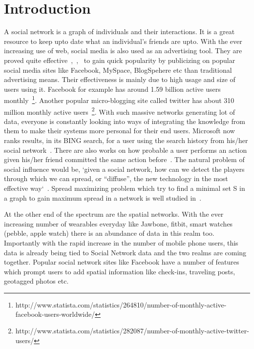 \section{Introduction}
A social network is a graph of individuals and their interactions. It is a great resource to keep upto date what an individual's friends are upto. With the ever increasing use of web, social media is also used as an advertising tool. They are proved quite effective~\cite{F1969},~\cite{JP1987},~\cite{PM2001} to gain quick popularity by publicizing on popular social media sites like Facebook, MySpace, BlogSpehere etc than traditional advertising means. Their effectiveness is mainly due to high usage and size of users using it. Facebook for example has around 1.59 billion active users monthly~\footnote{http://www.statista.com/statistics/264810/number-of-monthly-active-facebook-users-worldwide/}. Another popular micro-blogging site called twitter has about 310 million monthly active users~\footnote{http://www.statista.com/statistics/282087/number-of-monthly-active-twitter-users/}. With such massive networks generating lot of data, everyone is constantly looking into ways of integrating the knowledge from them to make their systems more personal for their end users. Microsoft now ranks results, in its BING search, for a user using the search history from his/her social network~\cite{M2011}. There are also works on how probable a user performs an action given his/her friend committed the same action before~\cite{DJE2003}. The natural problem of social influence would be, `given a social network, how can we detect the players through which we can spread, or “diffuse”, the new technology in the most effective way`~\cite{EA2007}. Spread maximizing problem which try to find a minimal set S in a graph to gain maximum spread in a network is well studied in~\cite{MP2002}.

At the other end of the spectrum are the spatial networks. With the ever increasing number of wearables everyday like Jawbone, fitbit, smart watches (pebble, apple watch) there is an abundance of data in this realm too. Importantly with the rapid increase in the number of mobile phone users, this data is already being tied to Social Network data and the two realms are coming together. Popular social network sites like Facebook have a number of features which prompt users to add spatial information like check-ins, traveling posts, geotagged photos etc.

